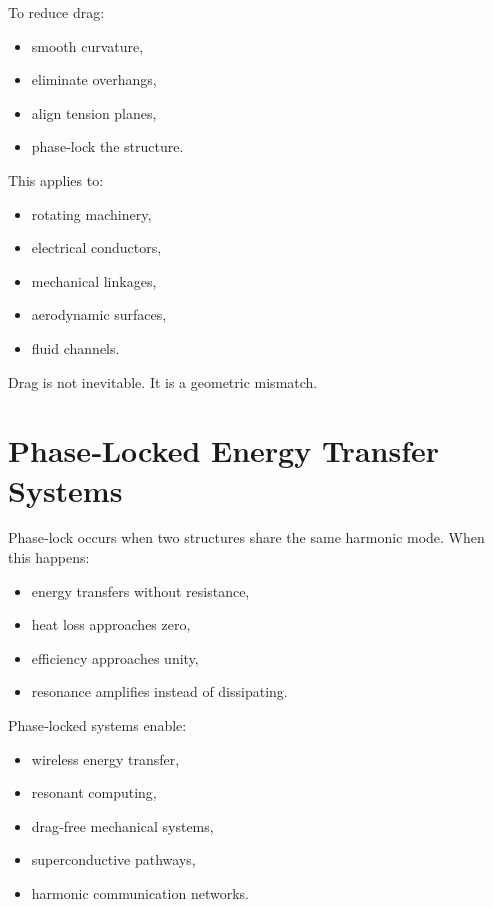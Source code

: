 \documentclass[11pt, letterpaper, openany]{book}
\begin{document}
To reduce drag:

\begin{itemize}
    \item smooth curvature,
    \item eliminate overhangs,
    \item align tension planes,
    \item phase‑lock the structure.
\end{itemize}

This applies to:

\begin{itemize}
    \item rotating machinery,
    \item electrical conductors,
    \item mechanical linkages,
    \item aerodynamic surfaces,
    \item fluid channels.
\end{itemize}

Drag is not inevitable.  
It is a geometric mismatch.

\section{Phase‑Locked Energy Transfer Systems}

Phase‑lock occurs when two structures share the same harmonic mode. When this
happens:

\begin{itemize}
    \item energy transfers without resistance,
    \item heat loss approaches zero,
    \item efficiency approaches unity,
    \item resonance amplifies instead of dissipating.
\end{itemize}

Phase‑locked systems enable:

\begin{itemize}
    \item wireless energy transfer,
    \item resonant computing,
    \item drag‑free mechanical systems,
    \item superconductive pathways,
    \item harmonic communication networks.
\end{itemize}
\end{document}

